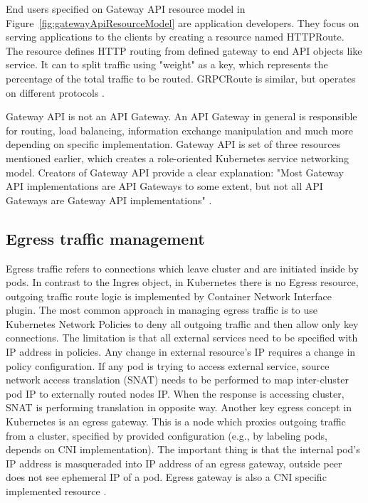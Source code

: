 End users specified on Gateway API resource model in Figure~\ref{fig:gatewayApiResourceModel} are application developers. They focus on serving applications to the clients by creating a resource named HTTPRoute. The resource defines HTTP routing from defined gateway to end API objects like service. It can to split traffic using "weight" as a key, which represents the percentage of the total traffic to be routed. GRPCRoute is similar, but operates on different protocols \cite{KubernetesDocs}\cite{KubernetesGatewayAPI}. 



Gateway API is not an API Gateway. An API Gateway in general is responsible for routing, load balancing, information exchange manipulation and much more depending on specific implementation. Gateway API is set of three resources mentioned earlier, which creates a role-oriented Kubernetes service networking model. Creators of Gateway API provide a clear explanation: "Most Gateway API implementations are API Gateways to some extent, but not all API Gateways are Gateway API implementations" \cite{KubernetesGatewayAPI}. 


\subsection{Egress traffic management}
\label{sec:egressTrafficMngmnt}

Egress traffic refers to connections which leave cluster and are initiated inside by pods. In contrast to the Ingres object, in Kubernetes there is no Egress resource, outgoing traffic route logic is implemented by Container Network Interface plugin. The most common approach in managing egress traffic is to use Kubernetes Network Policies to deny all outgoing traffic and then allow only key connections. The limitation is that all external services need to be specified with IP address in policies. Any change in external resource's IP requires a change in policy configuration. If any pod is trying to access external service, source network access translation (SNAT) needs to be performed to map inter-cluster pod IP to externally routed nodes IP. When the response is accessing cluster, SNAT is performing translation in opposite way. Another key egress concept in Kubernetes is an egress gateway. This is a node which proxies outgoing traffic from a cluster, specified by provided configuration (e.g., by labeling pods, depends on CNI implementation). The important thing is that the internal pod's IP address is masqueraded into IP address of an egress gateway, outside peer does not see ephemeral IP of a pod. Egress gateway is also a CNI specific implemented resource \cite{CalicoDocs} \cite{CiliumDocs}. 


